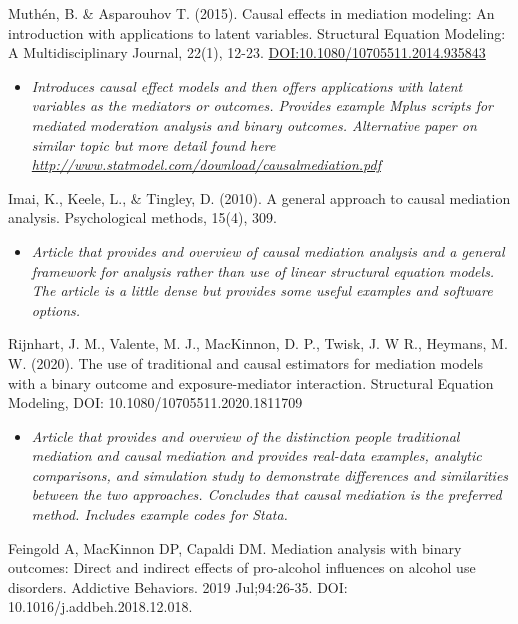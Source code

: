 \documentclass[
]{book}
\providecommand{\tightlist}{%
  \setlength{\itemsep}{0pt}\setlength{\parskip}{0pt}}
\begin{document}
Muthén, B. \& Asparouhov T. (2015). Causal effects in mediation modeling: An introduction with applications to latent variables. Structural Equation Modeling: A Multidisciplinary Journal, 22(1), 12-23. \url{DOI:10.1080/10705511.2014.935843}

\begin{itemize}
\tightlist
\item
  \emph{Introduces causal effect models and then offers applications with latent variables as the mediators or outcomes. Provides example Mplus scripts for mediated moderation analysis and binary outcomes. Alternative paper on similar topic but more detail found here \url{http://www.statmodel.com/download/causalmediation.pdf}}
\end{itemize}

Imai, K., Keele, L., \& Tingley, D. (2010). A general approach to causal mediation analysis. Psychological methods, 15(4), 309.

\begin{itemize}
\tightlist
\item
  \emph{Article that provides and overview of causal mediation analysis and a general framework for analysis rather than use of linear structural equation models. The article is a little dense but provides some useful examples and software options. }
\end{itemize}

Rijnhart, J. M., Valente, M. J., MacKinnon, D. P., Twisk, J. W R., Heymans, M. W. (2020). The use of traditional and causal estimators for mediation models with a binary outcome and exposure-mediator interaction. Structural Equation Modeling, DOI: 10.1080/10705511.2020.1811709

\begin{itemize}
\tightlist
\item
  \emph{Article that provides and overview of the distinction people traditional mediation and causal mediation and provides real-data examples, analytic comparisons, and simulation study to demonstrate differences and similarities between the two approaches. Concludes that causal mediation is the preferred method. Includes example codes for Stata. }
\end{itemize}

Feingold A, MacKinnon DP, Capaldi DM. Mediation analysis with binary outcomes: Direct and indirect effects of pro-alcohol influences on alcohol use disorders. Addictive Behaviors. 2019 Jul;94:26-35. DOI: 10.1016/j.addbeh.2018.12.018.
\end{document}
